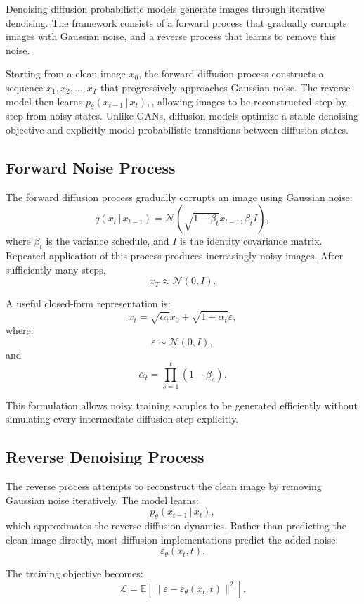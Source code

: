 \documentclass[12pt,oneside]{article}
\newcommand{\E}{\mathbb{E}}
\newcommand{\given}{\,|\,}
\begin{document}
Denoising diffusion probabilistic models generate images through iterative denoising. The framework consists of a forward process that gradually corrupts images with Gaussian noise, and a reverse process that learns to remove this noise.

Starting from a clean image $x_0$, the forward diffusion process constructs a sequence $x_1,x_2,\ldots,x_T$
that progressively approaches Gaussian noise.
The reverse model then learns $p_\theta(x_{t-1}\given x_t),$, allowing images to be reconstructed step-by-step from noisy states.
Unlike GANs, diffusion models optimize a stable denoising objective and explicitly model probabilistic transitions between diffusion states.

\subsection{Forward Noise Process}

The forward diffusion process gradually corrupts an image using Gaussian noise:
\[
q(x_t \given x_{t-1})
=
\mathcal{N}
\left(
\sqrt{1-\beta_t}x_{t-1},
\beta_t I
\right),
\]
where $\beta_t$ is the variance schedule, and $I$ is the identity covariance matrix.
Repeated application of this process produces increasingly noisy images. After sufficiently many steps,
\[
x_T
\approx
\mathcal{N}(0,I).
\]

A useful closed-form representation is:
\[
x_t
=
\sqrt{\bar{\alpha}_t}x_0
+
\sqrt{1-\bar{\alpha}_t}\varepsilon,
\]
where:
\[
\varepsilon \sim \mathcal{N}(0,I),
\]
and
\[
\bar{\alpha}_t
=
\prod_{s=1}^t (1-\beta_s).
\]

This formulation allows noisy training samples to be generated efficiently without simulating every intermediate diffusion step explicitly.

\subsection{Reverse Denoising Process}

The reverse process attempts to reconstruct the clean image by removing Gaussian noise iteratively.
The model learns:
\[
p_\theta(x_{t-1}\given x_t),
\]
which approximates the reverse diffusion dynamics.
Rather than predicting the clean image directly, most diffusion implementations predict the added noise:
\[
\varepsilon_\theta(x_t,t).
\]

The training objective becomes:
\[
\mathcal{L}
=
\E
\left[
\|
\varepsilon
-
\varepsilon_\theta(x_t,t)
\|^2
\right].
\]
\end{document}
